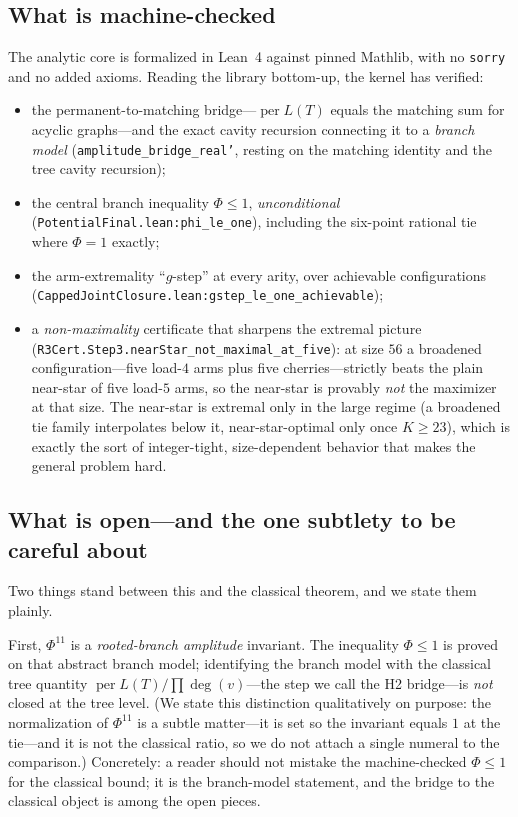 \subsection{What is machine-checked}

The analytic core is formalized in Lean~4 against pinned Mathlib, with no
\texttt{sorry} and no added axioms. Reading the library bottom-up, the kernel has
verified:
\begin{itemize}
  \item the permanent-to-matching bridge---$\operatorname{per} L(T)$ equals the
    matching sum for acyclic graphs---and the exact cavity recursion connecting it
    to a \emph{branch model} (\texttt{amplitude\_bridge\_real'}, resting on the
    matching identity and the tree cavity recursion);
  \item the central branch inequality $\Phi \le 1$, \emph{unconditional}
    (\texttt{PotentialFinal.lean:phi\_le\_one}), including the six-point rational
    tie where $\Phi = 1$ exactly;
  \item the arm-extremality ``$g$-step'' at every arity, over achievable
    configurations (\texttt{CappedJointClosure.lean:gstep\_le\_one\_achievable});
  \item a \emph{non-maximality} certificate that sharpens the extremal picture
    (\texttt{R3Cert.Step3.nearStar\_not\_maximal\_at\_five}): at size $56$ a
    broadened configuration---five load-$4$ arms plus five cherries---strictly
    beats the plain near-star of five load-$5$ arms, so the near-star is provably
    \emph{not} the maximizer at that size. The near-star is extremal only in the
    large regime (a broadened tie family interpolates below it, near-star-optimal
    only once $K \ge 23$), which is exactly the sort of integer-tight, size-dependent
    behavior that makes the general problem hard.
\end{itemize}

\subsection{What is open---and the one subtlety to be careful about}

Two things stand between this and the classical theorem, and we state them
plainly.

First, $\Phi^{11}$ is a \emph{rooted-branch amplitude} invariant. The inequality
$\Phi \le 1$ is proved on that abstract branch model; identifying the branch model
with the classical tree quantity $\operatorname{per} L(T)/\prod \deg(v)$---the
step we call the H2 bridge---is \emph{not} closed at the tree level. (We state
this distinction qualitatively on purpose: the normalization of $\Phi^{11}$ is a
subtle matter---it is set so the invariant equals $1$ at the tie---and it is not
the classical ratio, so we do not attach a single numeral to the comparison.)
Concretely: a reader should not mistake the machine-checked $\Phi \le 1$ for the
classical bound; it is the branch-model statement, and the bridge to the classical
object is among the open pieces.

